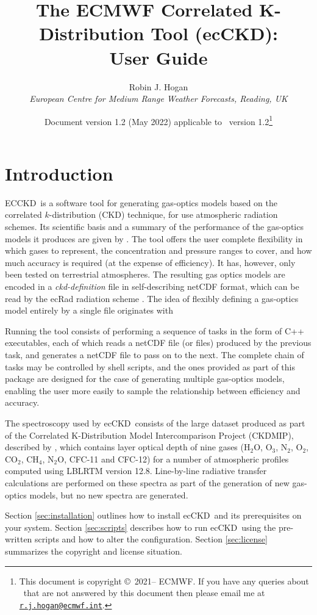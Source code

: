 \documentclass[a4,oneside]{article}
\title{The ECMWF Correlated K-Distribution Tool (ecCKD): \\ User Guide}
\author{Robin J. Hogan\\ \emph{European Centre for Medium Range
    Weather Forecasts, Reading, UK}}
\date{Document version 1.2 (May 2022) applicable to 
  \ecckd\ version 1.2\thanks{This document is copyright
    \copyright\ 2021-- ECMWF. If you have any queries about
    \ecckd\ that are not answered by this document
%
%
    then please email me at
    \href{mailto:r.j.hogan@ecmwf.int}{\texttt{r.j.hogan@ecmwf.int}}.}}
\newcommand{\ecckd}{ecCKD}
\newcommand{\Ecckd}{ECCKD}
\begin{document}
\maketitle

\section{Introduction}
\Ecckd\ is a software tool for generating gas-optics models based on
the correlated $k$-distribution (CKD) technique, for use atmospheric
radiation schemes. Its scientific basis and a summary of the
performance of the gas-optics models it produces are given by
\cite{Hogan&2022}. The tool offers the user complete flexibility in
which gases to represent, the concentration and pressure ranges to
cover, and how much accuracy is required (at the expense of
efficiency). It has, however, only been tested on terrestrial
atmospheres.  The resulting gas optics models are encoded in a
\emph{ckd-definition} file in self-describing netCDF format, which can
be read by the ecRad radiation scheme \citep{Hogan&2018}. The idea of
flexibly defining a gas-optics model entirely by a single file
originates with \cite{Edwards&1996}

Running the tool consists of performing a sequence of tasks in the
form of C++ executables, each of which reads a netCDF file (or files)
produced by the previous task, and generates a netCDF file to pass on
to the next. The complete chain of tasks may be controlled by shell
scripts, and the ones provided as part of this package are designed
for the case of generating multiple gas-optics models, enabling the
user more easily to sample the relationship between efficiency and
accuracy.

The spectroscopy used by \ecckd\ consists of the large dataset
produced as part of the Correlated K-Distribution Model
Intercomparison Project (CKDMIP), described by \cite{Hogan&2020},
which contains layer optical depth of nine gases (H$_2$O, O$_3$,
N$_2$, O$_2$, CO$_2$, CH$_4$, N$_2$O, CFC-11 and CFC-12) for a number
of atmospheric profiles computed using LBLRTM version
12.8. Line-by-line radiative transfer calculations are performed on
these spectra as part of the generation of new gas-optics models, but
no new spectra are generated.

Section \ref{sec:installation} outlines how to install \ecckd\ and its
prerequisites on your system. Section \ref{sec:scripts} describes how
to run \ecckd\ using the pre-written scripts and how to alter the
configuration. Section \ref{sec:license} summarizes the copyright
and license situation.
\end{document}
